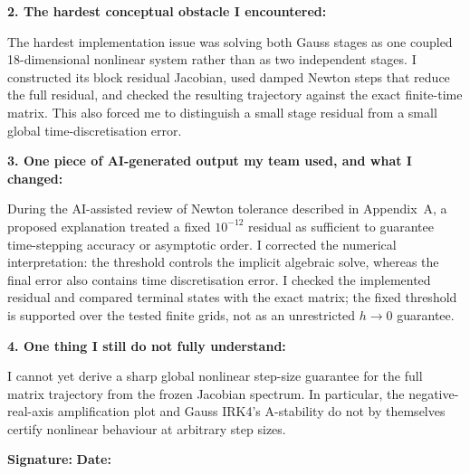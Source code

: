 \begin{formbox}
\textbf{2. The hardest conceptual obstacle I encountered:}

The hardest implementation issue was solving both Gauss stages as one coupled
18-dimensional nonlinear system rather than as two independent stages. I
constructed its block residual Jacobian, used damped Newton steps that reduce
the full residual, and checked the resulting trajectory against the exact
finite-time matrix. This also forced me to distinguish a small stage residual
from a small global time-discretisation error.

\textbf{3. One piece of AI-generated output my team used, and what I changed:}

During the AI-assisted review of Newton tolerance described in Appendix~A,
a proposed explanation treated a fixed $10^{-12}$ residual as sufficient to
guarantee time-stepping accuracy or asymptotic order. I corrected the
numerical interpretation: the threshold controls the
implicit algebraic solve, whereas the final error also contains time
discretisation error. I checked the implemented residual and compared terminal
states with the exact matrix; the fixed threshold is supported over the
tested finite grids, not as an unrestricted $h\to0$ guarantee.

\textbf{4. One thing I still do not fully understand:}

I cannot yet derive a sharp global nonlinear step-size guarantee for the full
matrix trajectory from the frozen Jacobian spectrum. In particular, the
negative-real-axis amplification plot and Gauss IRK4's A-stability do not by
themselves certify nonlinear behaviour at arbitrary step sizes.

\vspace{0.5em}
\textbf{Signature:} \underline{\hspace{4.5cm}} \hfill
\textbf{Date:} \underline{\hspace{2.5cm}}
\end{formbox}
\clearpage
